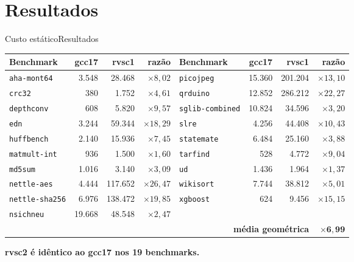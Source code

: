 \documentclass[aspectratio=169]{beamer} %
\begin{document}
\section{Resultados}

\begin{frame}{Custo estático}{Resultados}
    \centering\tiny
    \begin{tabular}{lrrr@{\qquad}lrrr}
        \toprule
        \textbf{Benchmark} & \textbf{gcc17} & \textbf{rvsc1} & \textbf{razão} &
        \textbf{Benchmark} & \textbf{gcc17} & \textbf{rvsc1} & \textbf{razão} \\
        \midrule
        \texttt{aha-mont64} & 3.548 & 28.468 & $\times 8{,}02$ & \texttt{picojpeg} & 15.360 & 201.204 & $\times 13{,}10$ \\
        \texttt{crc32} & 380 & 1.752 & $\times 4{,}61$ & \texttt{qrduino} & 12.852 & 286.212 & $\times 22{,}27$ \\
        \texttt{depthconv} & 608 & 5.820 & $\times 9{,}57$ & \texttt{sglib-combined} & 10.824 & 34.596 & $\times 3{,}20$ \\
        \texttt{edn} & 3.244 & 59.344 & $\times 18{,}29$ & \texttt{slre} & 4.256 & 44.408 & $\times 10{,}43$ \\
        \texttt{huffbench} & 2.140 & 15.936 & $\times 7{,}45$ & \texttt{statemate} & 6.484 & 25.160 & $\times 3{,}88$ \\
        \texttt{matmult-int} & 936 & 1.500 & $\times 1{,}60$ & \texttt{tarfind} & 528 & 4.772 & $\times 9{,}04$ \\
        \texttt{md5sum} & 1.016 & 3.140 & $\times 3{,}09$ & \texttt{ud} & 1.436 & 1.964 & $\times 1{,}37$ \\
        \texttt{nettle-aes} & 4.444 & 117.652 & $\times 26{,}47$ & \texttt{wikisort} & 7.744 & 38.812 & $\times 5{,}01$ \\
        \texttt{nettle-sha256} & 6.976 & 138.472 & $\times 19{,}85$ & \texttt{xgboost} & 624 & 9.456 & $\times 15{,}15$ \\
        \texttt{nsichneu} & 19.668 & 48.548 & $\times 2{,}47$ & & & & \\
        \midrule
        \multicolumn{7}{r}{\textbf{média geométrica}} & $\mathbf{\times 6{,}99}$ \\
        \bottomrule
    \end{tabular}

    \vspace{0.6em}
    \normalsize \textbf{rvsc2 é idêntico ao gcc17 nos 19 benchmarks.}
\end{frame}
\end{document}
